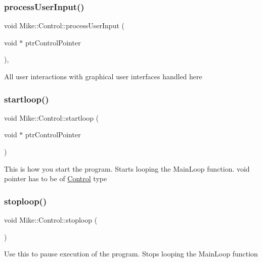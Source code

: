 \subsubsection{\texorpdfstring{process\+User\+Input()}{processUserInput()}}
{\footnotesize\ttfamily void Mike\+::\+Control\+::process\+User\+Input (\begin{DoxyParamCaption}\item[{void $\ast$}]{ptr\+Control\+Pointer }\end{DoxyParamCaption})\hspace{0.3cm}{\ttfamily [static]}, {\ttfamily [private]}}

All user interactions with graphical user interfaces handled here \mbox{\label{class_mike_1_1_control_ae34c60ef30c2de2332df13b644c7791f}} 
\subsubsection{\texorpdfstring{startloop()}{startloop()}}
{\footnotesize\ttfamily void Mike\+::\+Control\+::startloop (\begin{DoxyParamCaption}\item[{void $\ast$}]{ptr\+Control\+Pointer }\end{DoxyParamCaption})\hspace{0.3cm}{\ttfamily [static]}}

This is how you start the program. Starts looping the Main\+Loop function. void pointer has to be of \hyperlink{class_mike_1_1_control}{Control} type \mbox{\label{class_mike_1_1_control_aa26389eedd6e1c60fa64fe7883ce6ce8}} 
\subsubsection{\texorpdfstring{stoploop()}{stoploop()}}
{\footnotesize\ttfamily void Mike\+::\+Control\+::stoploop (\begin{DoxyParamCaption}{ }\end{DoxyParamCaption})}

Use this to pause execution of the program. Stops looping the Main\+Loop function 

